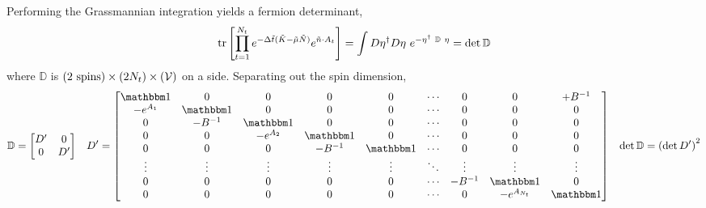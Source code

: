 Performing the Grassmannian integration yields a fermion determinant,
\begin{align}
	\text{tr}\left[\prod_{t=1}^{N_t} e^{-\Delta \tilde{t}(\tilde{K} - \tilde{\mu} \tilde{N})} e^{ \tilde{n}\cdot A_t} \right]
	=
	\int D\eta{}^{\dagger} D\eta ~ e^{- \eta^{\dagger} ~ \mathbb{D} ~ \eta} = \det \mathbb{D}
\end{align}
where $\mathbb{D}$ is $(2\text{ spins})\times(2N_t)\times(\mathcal{V})$ on a side.
Separating out the spin dimension,
\begin{align}
	\mathbb{D}
	&=
	\begin{bmatrix} D' & 0 \\ 0 & D' \end{bmatrix}
	&
	D'
	&=
	\begin{bmatrix} 
		\one     & 0                                        & 0        & 0                                        & 0      & \cdots & 0                                        & 0            & +B^{-1}
	\\	-e^{A_1} & \one                                     & 0        & 0                                        & 0      & \cdots & 0                                        & 0            & 0
	\\	0        & -B^{-1} & \one     & 0                                        & 0      & \cdots & 0                                        & 0            & 0
	\\	0        & 0                                        & -e^{A_2} & \one                                     & 0      & \cdots & 0                                        & 0            & 0
	\\	0        & 0                                        & 0        & -B^{-1} & \one   & \cdots & 0                                        & 0            & 0
	\\	\vdots   & \vdots                                   & \vdots   & \vdots                                   & \vdots & \ddots & \vdots                                   & \vdots       & \vdots
	\\	0        & 0                                        & 0        & 0                                        & 0      & \cdots & -B^{-1} & \one         & 0
	\\	0        & 0                                        & 0        & 0                                        & 0      & \cdots & 0                                        & -e^{A_{N_t}} & \one
	\end{bmatrix}
	&
	\det\mathbb{D} = \left(\det D'\right)^2
\end{align}
